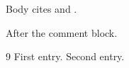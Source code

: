 \documentclass{article}
\begin{document}
Body cites \cite{a} and \cite{b}.

After the comment block.
\begin{thebibliography}{9}
 First entry.
 Second entry.
\end{thebibliography}
\end{document}
